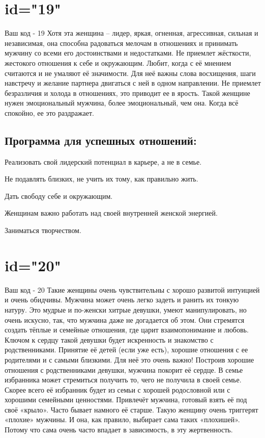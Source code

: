 \section{id="19"}{Ваш код - 19}
Хотя эта женщина – лидер, яркая, огненная, агрессивная, сильная и 
независимая, она способна радоваться мелочам в отношениях и принимать 
мужчину со всеми его достоинствами и недостатками. Не приемлет 
жёсткости, жестокого отношения к себе и окружающим. Любит, когда с 
её мнением считаются и не умаляют её значимости. Для неё важны слова 
восхищения, шаги навстречу и желание партнера двигаться с ней в 
одном направлении. Не приемлет безразличия и холода в отношениях, 
это приводит ее в ярость. Такой женщине нужен эмоциональный мужчина, 
более эмоциональный, чем она. Когда всё спокойно, ее это раздражает.
\subsection{Программа для успешных отношений:}
\item Реализовать свой лидерский потенциал в карьере, а не в семье.
\item Не подавлять близких, не учить их тому, как правильно жить.
\item Дать свободу себе и окружающим.
\item Женщинам важно работать над своей внутренней женской энергией.
\item Заниматься творчеством.
\endsubsection
\endsection

\section{id="20"}{Ваш код - 20}
Такие женщины очень чувствительны с хорошо развитой интуицией и очень 
обидчивы. Мужчина может очень легко задеть и ранить их тонкую натуру. 
Это мудрые и по-женски хитрые девушки, умеют манипулировать, но очень 
искусно, так, что мужчина даже не догадается об этом. Они стремятся 
создать тёплые и семейные отношения, где царит взаимопонимание и 
любовь. Ключом к сердцу такой девушки будет искренность и знакомство 
с родственниками. Принятие её детей (если уже есть), хорошие отношения 
с ее родителями и с самыми близкими. Для неё это очень важно! Построив 
хорошие отношения с родственниками девушки, мужчина покорит её сердце. 
В семье избранника может стремиться получить то, чего не получила в 
своей семье. Скорее всего её избранник будет из семьи с хорошей 
родословной или с хорошими семейными ценностями. Привлечёт мужчина, 
готовый взять её под своё «крыло». Часто бывает намного её старше. 
Такую женщину очень триггерят «плохие» мужчины. И она, как правило, 
выбирает сама таких «плохишей». Потому что сама очень часто впадает 
в зависимость, в эту жертвенность.
\endsubsection
\endsection

